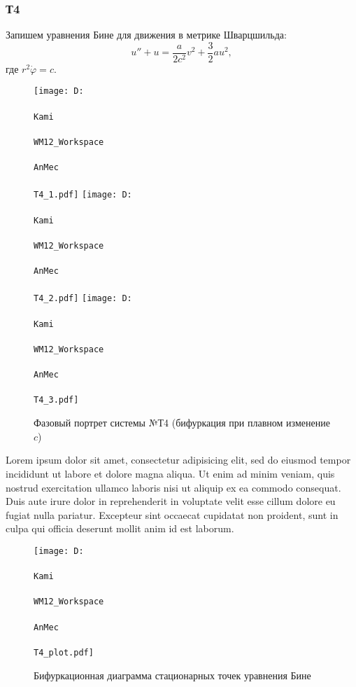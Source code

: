 \subsubsection*{Т4}

Запишем уравнения Бине для движения в метрике Шварцшильда:
\begin{equation*}
    u'' + u = \frac{a}{2c^2} v^2 + \frac{3}{2}a u^2,
\end{equation*}
где $r^2 \dot{\varphi} = c$.


\begin{figure}
    \centering
    \texttt{[image: D:\\\\Kami\\\\WM12\_Workspace\\\\AnMec\\\\T4\_1.pdf]}
    \hspace{0.2cm}
    \texttt{[image: D:\\\\Kami\\\\WM12\_Workspace\\\\AnMec\\\\T4\_2.pdf]}
    \hspace{0.2cm}
    \texttt{[image: D:\\\\Kami\\\\WM12\_Workspace\\\\AnMec\\\\T4\_3.pdf]}
    \caption{Фазовый портрет системы №Т4 (бифуркация при плавном изменение $c$)}
\end{figure}

Lorem ipsum dolor sit amet, consectetur adipisicing elit, sed do eiusmod
tempor incididunt ut labore et dolore magna aliqua. Ut enim ad minim veniam,
quis nostrud exercitation ullamco laboris nisi ut aliquip ex ea commodo
consequat. Duis aute irure dolor in reprehenderit in voluptate velit esse
cillum dolore eu fugiat nulla pariatur. Excepteur sint occaecat cupidatat non
proident, sunt in culpa qui officia deserunt mollit anim id est laborum.
\begin{figure}[h]
    \centering
    \texttt{[image: D:\\\\Kami\\\\WM12\_Workspace\\\\AnMec\\\\T4\_plot.pdf]}
    \caption{Бифуркационная диаграмма стационарных точек уравнения Бине}
\end{figure}
